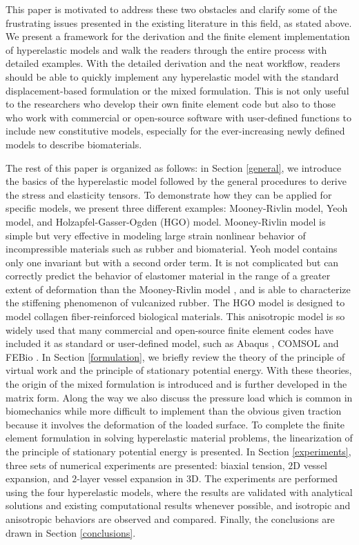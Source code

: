 This paper is motivated to address these two obstacles and clarify some of the frustrating issues presented in the existing literature in this field, as stated above. We present a framework for the derivation and the finite element implementation of hyperelastic models and walk the readers through the entire process with detailed examples. With the detailed derivation and the neat workflow, readers should be able to quickly implement any hyperelastic model with the standard displacement-based formulation or the mixed formulation. This is not only useful to the researchers who develop their own finite element code but also to those who work with commercial or open-source software with user-defined functions to include new constitutive models, especially for the ever-increasing newly defined models to describe biomaterials.

The rest of this paper is organized as follows: in Section \ref{general}, we introduce the basics of the hyperelastic model followed by the general procedures to derive the stress and elasticity tensors. To demonstrate how they can be applied for specific models, we present three different examples: Mooney-Rivlin model, Yeoh model, and Holzapfel-Gasser-Ogden (HGO) model. Mooney-Rivlin model is simple but very effective in modeling large strain nonlinear behavior of incompressible materials such as rubber and biomaterial. Yeoh model contains only one invariant but with a second order term. It is not complicated but can correctly predict the behavior of elastomer material in the range of a greater extent of deformation than the Mooney-Rivlin model \cite{Gajewski}, and is able to characterize the stiffening phenomenon of vulcanized rubber. The HGO model is designed to model collagen fiber-reinforced biological materials. This anisotropic model is so widely used that many commercial and open-source finite element codes have included it as standard or user-defined model,  such as Abaqus \cite{Abaqus}, COMSOL \cite{COMSOL} and FEBio \cite{FEBio}. In Section \ref{formulation}, we briefly review the theory of the principle of virtual work and the principle of stationary potential energy. With these theories, the origin of the mixed formulation is introduced and is further developed in the matrix form. Along the way we also discuss the pressure load which is common in biomechanics while more difficult to implement than the obvious given traction because it involves the deformation of the loaded surface. To complete the finite element formulation in solving hyperelastic material problems, the linearization of the principle of stationary potential energy is presented. In Section \ref{experiments}, three sets of numerical experiments are presented: biaxial tension, $2$D vessel expansion, and $2$-layer vessel expansion in $3$D. The experiments are performed using the four hyperelastic models, where the results are validated with analytical solutions and existing computational results whenever possible, and isotropic and anisotropic behaviors are observed and compared. Finally, the conclusions are drawn in Section \ref{conclusions}.




 



